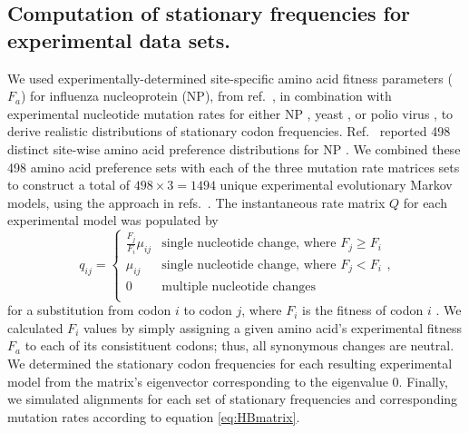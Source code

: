 \documentclass[11pt]{article}
\begin{document}
\subsection*{Computation of stationary frequencies for experimental data sets.}
We used experimentally-determined site-specific amino acid fitness parameters ($F_a$) for influenza nucleoprotein (NP), from ref.\ \cite{Bloom2014a}, in combination with experimental nucleotide mutation rates for either NP \cite{Bloom2014a}, yeast \cite{Zhu2014}, or polio virus \cite{Acevedo2014}, to derive realistic distributions of stationary codon frequencies. Ref.\ \cite{Bloom2014a} reported 498 distinct site-wise amino acid preference distributions for NP \cite{Bloom2014a}. We combined these 498 amino acid preference sets with each of the three mutation rate matrices sets to construct a total of $498 \times 3 = 1494$ unique experimental evolutionary Markov models, using the approach in refs.\ \cite{Bloom2014a,Bloom2014b}. The instantaneous rate matrix $Q$ for each experimental model was populated by 
\begin{equation}
q_{ij} =  \left\{ 
\begin{array}{rl}
  \frac{F_j}{F_i}\mu_{ij} &\mbox{single nucleotide change, where $F_j \geq F_i$} \\
  \mu_{ij}                &\mbox{single nucleotide change, where $F_j < F_i$}  \\ 
  0                       &\mbox{multiple nucleotide changes} \\        
\end{array} \right.,
\end{equation} for a substitution from codon $i$ to codon $j$, where $F_i$ is the fitness of codon $i$ \cite{Bloom2014a,Bloom2014b}. We calculated $F_i$ values by simply assigning a given amino acid's experimental fitness $F_a$ to each of its consistituent codons; thus, all synonymous changes are neutral. We determined the stationary codon frequencies for each resulting experimental model from the matrix's eigenvector corresponding to the eigenvalue 0. Finally, we simulated alignments for each set of stationary frequencies and corresponding mutation rates according to equation \eqref{eq:HBmatrix}.   

		
\end{document}
